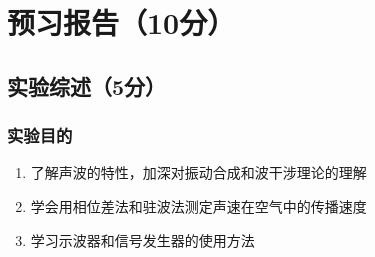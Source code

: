 \documentclass{../template/Preport}
\begin{document}
\makeatletter
\renewcommand{\figurename}{图}
\renewcommand{\tablename}{表}
\setcounter{page}{0}
\makecover

\section{预习报告（10分）}
\subsection{实验综述（5分）}
\subsubsection{实验目的}
\begin{enumerate}
	\item 了解声波的特性，加深对振动合成和波干涉理论的理解
	\item 学会用相位差法和驻波法测定声速在空气中的传播速度
	\item 学习示波器和信号发生器的使用方法
\end{enumerate}
\end{document}
